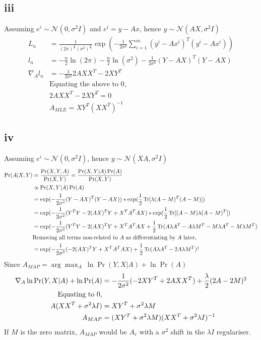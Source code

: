 \documentclass[twoside]{Homework}
\DeclareMathOperator{\Tr}{Tr}
\begin{document}
\subsection*{iii}
Assuming $e^i \sim \mathcal{N}(0, \sigma^2 I)$ and $e^i = y - Ax$, hence $y \sim \mathcal{N}(AX, \sigma^2 I)$
\begin{align*}
L_{n} 
&= \frac{1}{(2\pi)^{\frac{n}{2}} (\sigma^2)^{\frac{n}{2}}} \exp(-\frac{1}{2\sigma^2} \sum^{m}_{i=1} (y^i - Ax^i)^T (y^i - Ax^i))\\
l_n
&= -\frac{n}{2}\ln (2\pi) -\frac{n}{2}\ln (\sigma^2) - \frac{1}{2\sigma^2} (Y - AX)^T (Y - AX)\\
\nabla_A l_n
&= -\frac{1}{2\sigma^2} 2 A X X^{T} - 2 X Y^T\\
&\textrm{Equating the above to 0,}\\
&2 A X X^{T} - 2 XY^{T} = 0\\
&A_{MLE} = XY^T (X X^{T})^{-1}
\end{align*}

\subsection*{iv}
Assuming $e^i \sim \mathcal{N}(0, \sigma^2 I)$, hence $y \sim \mathcal{N}(XA, \sigma^2 I)$
\begin{align*}
\Pr(A|X, Y) 
&= \frac{\Pr(X, Y, A)}{\Pr(X,Y)} = \frac{\Pr(X, Y| A)\Pr(A)}{\Pr(X,Y)}\\ 
&\propto \Pr(X, Y| A)\Pr(A)\\
&= \exp(-\frac{1}{2\sigma^2} (Y - AX)^T (Y - AX)) * \exp(\frac{1}{2}\Tr[\lambda(A-M)^T(A-M)])\\
&= \exp(-\frac{1}{2\sigma^2} (Y^{T}Y - 2(AX)^{T}Y + X^T A^T AX) * \exp(\frac{1}{2}\Tr[(A-M)\lambda(A-M)^T])\\
&= \exp(-\frac{1}{2\sigma^2} (Y^{T}Y - 2(AX)^{T}Y + X^T A^T AX + \frac{1}{2}\Tr(A\lambda A^T - A\lambda M^T - M\lambda A^T - M\lambda M^T)\\
&\textrm{Removing all terms non-related to $A$ as differentiating by $A$ later,}\\
&= \exp(-\frac{1}{2\sigma^2} (- 2(AX)^{T}Y + X^T A^T AX) + \frac{1}{2}\Tr(A\lambda A^T - 2A\lambda M^T)\footnotemark
\end{align*}
\newpage
\noindent
Since $A_{MAP} = \arg\max_{A}\ \ln\Pr(Y, X| A) + \ln\Pr(A)$
\begin{align*}
\nabla_A \ln\Pr(Y, X| A) + \ln\Pr(A)
&= -\frac{1}{2\sigma^2} (-2XY^{T} + 2A X X^{T})+ \frac{\lambda}{2}(2A - 2M)\footnotemark\\
\textrm{Equating to 0,}\\
A(X X^{T} + \sigma^2 \lambda I) &= XY^{T} + \sigma^2 \lambda M\\
A_{MAP} &= (XY^{T} + \sigma^2 \lambda M)(X X^{T} + \sigma^2 \lambda I)^{-1}
\end{align*}
If $M$ is the zero matrix, $A_{MAP}$ would be $A_{r}$ with a $\sigma^2$ shift in the $\lambda I$ regulariser.
\end{document}
